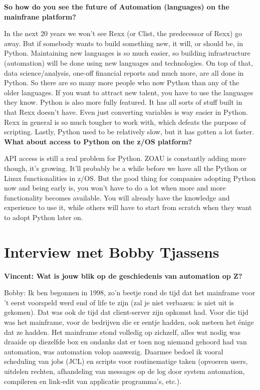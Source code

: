 \textbf{So how do you see the future of Automation (languages) on the mainfrane platform?}

In the next 20 years we won't see Rexx (or Clist, the predecessor of Rexx) go away. But if somebody wants to build something new, it will, or should be, in Python. Maintaining new languages is so much easier, so building infrastructure (automation) will be done using new languages and technologies.
On top of that, data science/analysis, one-off financial reports and much more, are all done in Python. So there are so many more people who now Python than any of the older languages. If you want to attract new talent, you have to use the languages they know.
Python is also more fully featured. It has all sorts of stuff built in that Rexx doesn't have. Even just converting variables is way easier in Python. Rexx in general is so much tougher to work with, which defeats the purpose of scripting.
Lastly, Python used to be relatively slow, but it has gotten a lot faster.\\

\textbf{What about access to Python on the z/OS platform?}

API access is still a real problem for Python. ZOAU is constantly adding more though, it's growing. It'll probably be a while before we have all the Python or Linux functionalities in z/OS. But the good thing for companies adopting Python now and being early is, you won't have to do a lot when more and more functionality becomes available. You will already have the knowledge and experience to use it, while others will have to start from scratch when they want to adopt Python later on.


\section{Interview met Bobby Tjassens}
\label{InterviewBobby}
\textbf{Vincent: Wat is jouw blik op de geschiedenis van automation op Z?}


Bobby:
Ik ben begonnen in 1998, zo'n beetje rond de tijd dat het mainframe voor 't eerst voorspeld werd end of life te zijn (zal je niet verbazen: is niet uit is gekomen). Dat was ook de tijd dat client-server zijn opkomst had. Voor die tijd was het mainframe, voor de bedrijven die er eentje hadden, ook meteen het énige dat ze hadden. Het mainframe stond volledig op zichzelf, alles wat nodig was draaide op diezelfde box en ondanks dat er toen nog niemand gehoord had van automation, was automation volop aanwezig. Daarmee bedoel ik vooral scheduling van jobs (JCL) en scripts voor routinematige taken (opvoeren users, uitdelen rechten, afhandeling van messages op de log door system automation, compileren en link-edit van applicatie programma's, etc.).

